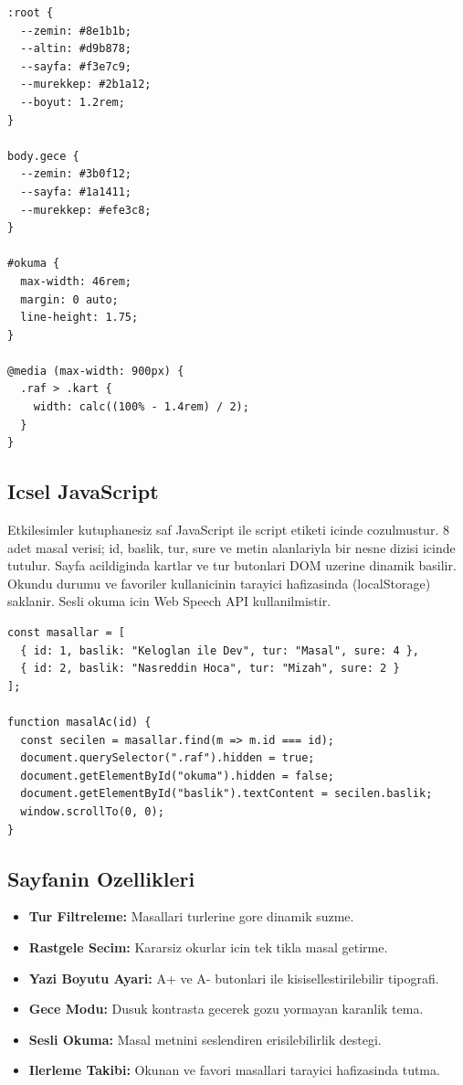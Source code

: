 \documentclass[12pt,a4paper]{article}
\begin{document}
\begin{lstlisting}[caption={Icsel CSS Degiskenleri ve Grid Yapisi}]
:root {
  --zemin: #8e1b1b;
  --altin: #d9b878;
  --sayfa: #f3e7c9;
  --murekkep: #2b1a12;
  --boyut: 1.2rem;
}

body.gece {
  --zemin: #3b0f12;
  --sayfa: #1a1411;
  --murekkep: #efe3c8;
}

#okuma {
  max-width: 46rem;
  margin: 0 auto;
  line-height: 1.75;
}

@media (max-width: 900px) {
  .raf > .kart {
    width: calc((100% - 1.4rem) / 2);
  }
}
\end{lstlisting}

\subsection{Icsel JavaScript}
Etkilesimler kutuphanesiz saf JavaScript ile script etiketi icinde cozulmustur. 8 adet masal verisi; id, baslik, tur, sure ve metin alanlariyla bir nesne dizisi icinde tutulur. Sayfa acildiginda kartlar ve tur butonlari DOM uzerine dinamik basilir. Okundu durumu ve favoriler kullanicinin tarayici hafizasinda (localStorage) saklanir. Sesli okuma icin Web Speech API kullanilmistir.

\begin{lstlisting}[caption={Icsel JavaScript Masal Dizisi ve Okuma Fonksiyonu}]
const masallar = [
  { id: 1, baslik: "Keloglan ile Dev", tur: "Masal", sure: 4 },
  { id: 2, baslik: "Nasreddin Hoca", tur: "Mizah", sure: 2 }
];

function masalAc(id) {
  const secilen = masallar.find(m => m.id === id);
  document.querySelector(".raf").hidden = true;
  document.getElementById("okuma").hidden = false;
  document.getElementById("baslik").textContent = secilen.baslik;
  window.scrollTo(0, 0);
}
\end{lstlisting}

\subsection{Sayfanin Ozellikleri}
\begin{itemize}
  \item \textbf{Tur Filtreleme:} Masallari turlerine gore dinamik suzme.
  \item \textbf{Rastgele Secim:} Kararsiz okurlar icin tek tikla masal getirme.
  \item \textbf{Yazi Boyutu Ayari:} A+ ve A- butonlari ile kisisellestirilebilir tipografi.
  \item \textbf{Gece Modu:} Dusuk kontrasta gecerek gozu yormayan karanlik tema.
  \item \textbf{Sesli Okuma:} Masal metnini seslendiren erisilebilirlik destegi.
  \item \textbf{Ilerleme Takibi:} Okunan ve favori masallari tarayici hafizasinda tutma.
\end{itemize}
\end{document}

